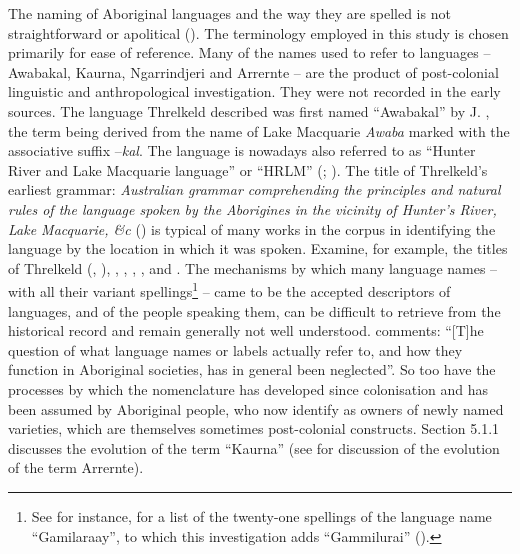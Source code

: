The naming of Aboriginal languages and the way they are spelled is not straightforward or apolitical (\citealt{sutton_australian_1979,RosenbergBowerninPress}). The terminology employed in this study is chosen primarily for ease of reference. Many of the names used to refer to languages – Awabakal, Kaurna, Ngarrindjeri and Arrernte – are the product of post-colonial linguistic and anthropological investigation. They were not recorded in the early sources. The language Threlkeld described was first named “Awabakal” by J. \citet[v]{fraser_australian_1892}, the term being derived from the name of Lake Macquarie \textit{Awaba} marked with the associative suffix –\textit{kal}. The language is nowadays also referred to as “Hunter River and Lake Macquarie language” or “HRLM” (\citealt{lissarrague_salvage_2006}; \citealt{wafer_waiting_2011}). The title of Threlkeld’s earliest grammar: \textit{Australian grammar comprehending the principles and natural rules of the language spoken by the Aborigines in the vicinity of Hunter’s River, Lake Macquarie, \&c }(\citeyear{threlkeld_australian_1834}) is typical of many works in the corpus in identifying the language by the location in which it was spoken. Examine, for example, the titles of Threlkeld (\citealt{threlkeld_specimens_1927}, \citeyear{threlkeld_key_1850}), \citet{teichelmann_outlines_1840}, \citet{meyer_vocabulary_1843}, \citet{moorhouse_vocabulary_1846}, \citet{hagenauer_language_1878}, and \citet{kempe_grammar_1891}. The mechanisms by which many language names – with all their variant spellings\footnote{See for instance, \citet[8]{austin_reference_1993} for a list of the twenty-one spellings of the language name “Gamilaraay”, to which this investigation adds “Gammilurai” ().}  – came to be the accepted descriptors of languages, and of the people speaking them, can be difficult to retrieve from the historical record and remain generally not well understood. \citet[89]{sutton_australian_1979} comments: “[T]he question of what language names or labels actually refer to, and how they function in Aboriginal societies, has in general been neglected”. So too have the processes by which the nomenclature has developed since colonisation and has been assumed by Aboriginal people, who now identify as owners of newly named varieties, which are themselves sometimes post-colonial constructs. Section 5.1.1 discusses the evolution of the term “Kaurna” (see \citealt{Stockigt2021a,Stockigtinpress} for discussion of the evolution of the term Arrernte).

